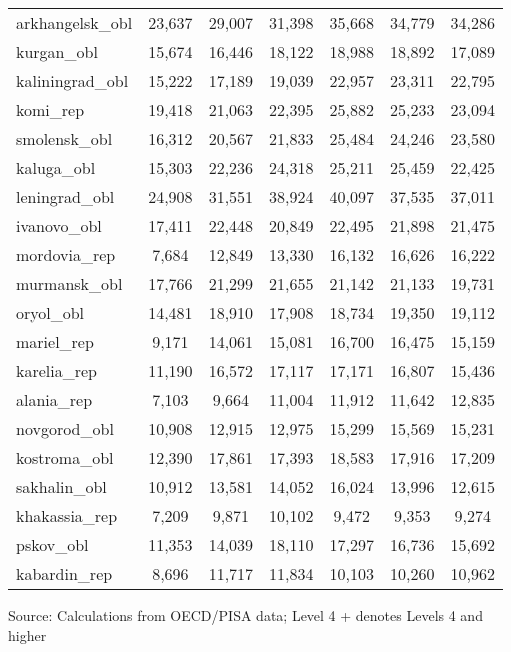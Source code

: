 \documentclass[alpha-refs,fleqn]{wiley-article_p2}
\begin{document}
\begin{table}[h]
\begin{threeparttable}
\begin{tabular}{p{5.5cm}cccccc}
arkhangelsk\_obl	&	23,637	&	29,007	&	31,398	&	35,668	&	34,779	&	34,286	\\
kurgan\_obl	&	15,674	&	16,446	&	18,122	&	18,988	&	18,892	&	17,089	\\
kaliningrad\_obl	&	15,222	&	17,189	&	19,039	&	22,957	&	23,311	&	22,795	\\
komi\_rep	&	19,418	&	21,063	&	22,395	&	25,882	&	25,233	&	23,094	\\
smolensk\_obl	&	16,312	&	20,567	&	21,833	&	25,484	&	24,246	&	23,580	\\
kaluga\_obl	&	15,303	&	22,236	&	24,318	&	25,211	&	25,459	&	22,425	\\
leningrad\_obl	&	24,908	&	31,551	&	38,924	&	40,097	&	37,535	&	37,011	\\
ivanovo\_obl	&	17,411	&	22,448	&	20,849	&	22,495	&	21,898	&	21,475	\\
mordovia\_rep	&	7,684	&	12,849	&	13,330	&	16,132	&	16,626	&	16,222	\\
murmansk\_obl	&	17,766	&	21,299	&	21,655	&	21,142	&	21,133	&	19,731	\\
oryol\_obl	&	14,481	&	18,910	&	17,908	&	18,734	&	19,350	&	19,112	\\
mariel\_rep	&	9,171	&	14,061	&	15,081	&	16,700	&	16,475	&	15,159	\\
karelia\_rep	&	11,190	&	16,572	&	17,117	&	17,171	&	16,807	&	15,436	\\
alania\_rep	&	7,103	&	9,664	&	11,004	&	11,912	&	11,642	&	12,835	\\
novgorod\_obl	&	10,908	&	12,915	&	12,975	&	15,299	&	15,569	&	15,231	\\
kostroma\_obl	&	12,390	&	17,861	&	17,393	&	18,583	&	17,916	&	17,209	\\
sakhalin\_obl	&	10,912	&	13,581	&	14,052	&	16,024	&	13,996	&	12,615	\\
khakassia\_rep	&	7,209	&	9,871	&	10,102	&	9,472	&	9,353	&	9,274	\\
pskov\_obl	&	11,353	&	14,039	&	18,110	&	17,297	&	16,736	&	15,692	\\
kabardin\_rep	&	8,696	&	11,717	&	11,834	&	10,103	&	10,260	&	10,962	\\
\hline  %
\end{tabular}
\begin{tablenotes}
\item Source: Calculations from OECD/PISA data; Level 4 + denotes Levels 4 and higher
\end{tablenotes}
\end{threeparttable}
\end{table}
\end{document}

